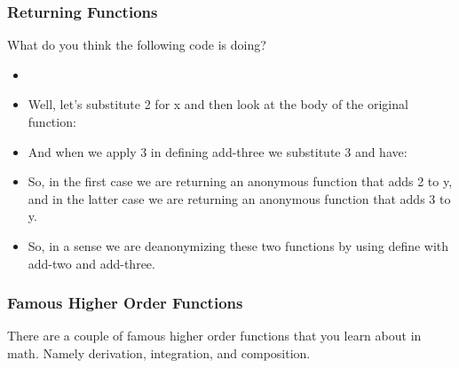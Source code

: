 \documentclass{beamer}
\begin{document}
\begin{frame}
  \frametitle{Returning Functions}
  What do you think the following code is doing?
  \begin{itemize}
  \item<2-> \Factory
  \item<3-> Well, let's substitute 2 for x and then look at the body
    of the original function:
    \SubTwo
  \item<4-> And when we apply 3 in defining add-three we substitute 3
    and have:
    \SubThree
  \item<5-> So, in the first case we are returning an anonymous function
    that adds 2 to y, and in the latter case we are returning an anonymous
    function that adds 3 to y.
  \item<6-> So, in a sense we are deanonymizing these two functions by
    using define with add-two and add-three.
  \end{itemize}
\end{frame}

\begin{frame}
  \frametitle{Famous Higher Order Functions}
  There are a couple of famous higher order functions that you learn
  about in math. Namely derivation, integration, and composition.
\end{frame}
\end{document}
